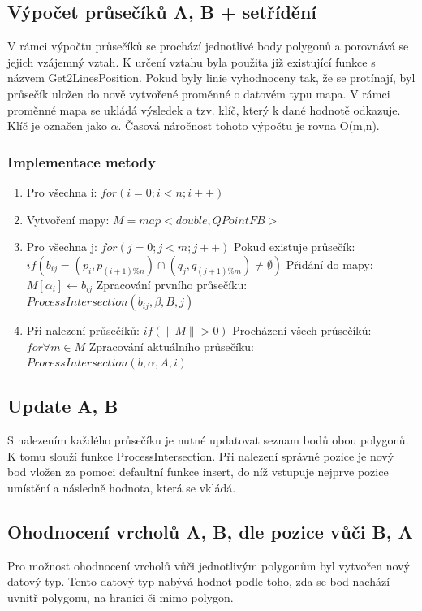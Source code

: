 \documentclass[a4paper, 12pt]{article}
\begin{document}
\subsection{Výpočet průsečíků A, B + setřídění}
V rámci výpočtu průsečíků se prochází jednotlivé body polygonů a porovnává se jejich vzájemný vztah. K určení vztahu byla použita již existující funkce s názvem Get2LinesPosition. Pokud byly linie vyhodnoceny tak, že se protínají, byl průsečík uložen do nově vytvořené proměnné o datovém typu mapa. V rámci proměnné mapa se ukládá výsledek a tzv. klíč, který k dané hodnotě odkazuje. Klíč je označen jako $\alpha$. Časová náročnost tohoto výpočtu je rovna O(m,n).

\subsubsection{Implementace metody}
\begin{enumerate}
\item Pro všechna i: $for (i = 0; i < n; i++)$
\item Vytvoření mapy: $ M = map<double, QPointFB>$
\item Pro všechna j: $for (j = 0; j < m; j++)$
\subitem Pokud existuje průsečík: $if (b_{ij} = (p_i, p_{(i+1)\%n}) \cap (q_j, q_{(j+1)\%m})  \neq \emptyset  )$
\subitem Přidání do mapy: $M[\alpha_i] \leftarrow b_{ij}$
\subitem Zpracování prvního průsečíku: $ProcessIntersection (b_{ij}, \beta, B, j)$
\item Při nalezení průsečíků: $if (\| M \| > 0) $
\subitem Procházení všech průsečíků: $for \forall m \in M$
\subitem Zpracování aktuálního průsečíku: $ProcessIntersection(b, \alpha, A, i)$

\end{enumerate}


\subsection{Update A, B}
S nalezením každého průsečíku je nutné updatovat seznam bodů obou polygonů. K tomu slouží funkce ProcessIntersection. Při nalezení správné pozice je nový bod vložen za pomoci defaultní funkce insert, do níž vstupuje nejprve pozice umístění a následně hodnota, která se vkládá.

\subsection{Ohodnocení vrcholů A, B, dle pozice vůči B, A}
Pro možnost ohodnocení vrcholů vůči jednotlivým polygonům byl vytvořen nový datový typ. Tento datový typ nabývá hodnot podle toho, zda se bod nachází uvnitř polygonu, na hranici či mimo polygon. 
\end{document}
